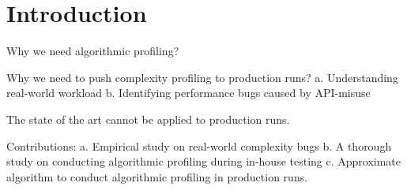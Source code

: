 \section{Introduction}
\label{sec:intro}

Why we need algorithmic profiling? 

Why we need to push complexity profiling to production runs? 
a. Understanding real-world workload
b. Identifying performance bugs caused by API-misuse

The state of the art cannot be applied to production runs. 

Contributions:
a. Empirical study on real-world complexity bugs
b. A thorough study on conducting algorithmic profiling during in-house testing
c. Approximate algorithm to conduct algorithmic profiling in production runs. 
